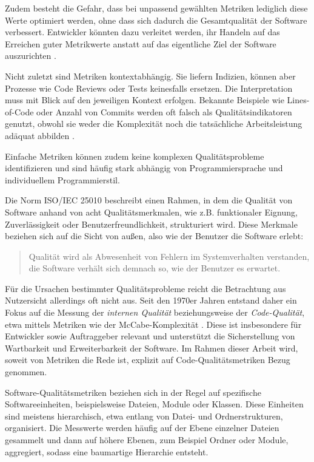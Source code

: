 Zudem besteht die Gefahr, dass bei unpassend gewählten Metriken lediglich diese Werte optimiert werden, ohne dass sich dadurch die Gesamtqualität der Software verbessert. Entwickler könnten dazu verleitet werden, ihr Handeln auf das Erreichen guter Metrikwerte anstatt auf das eigentliche Ziel der Software auszurichten \cite{worst_gitclear_2025}.

Nicht zuletzt sind Metriken kontextabhängig. Sie liefern Indizien, können aber Prozesse wie Code Reviews oder Tests keinesfalls ersetzen. Die Interpretation muss mit Blick auf den jeweiligen Kontext erfolgen. Bekannte Beispiele wie Lines-of-Code oder Anzahl von Commits werden oft falsch als Qualitätsindikatoren genutzt, obwohl sie weder die Komplexität noch die tatsächliche Arbeitsleistung adäquat abbilden \cite{worst_gitclear_2025}.

Einfache Metriken können zudem keine komplexen Qualitätsprobleme identifizieren \cite{voas_kuhn_2017} und sind häufig stark abhängig von Programmiersprache und individuellem Programmierstil.

\smallskip


Die Norm ISO/IEC 25010 \cite{iso25010_2024} beschreibt einen Rahmen, in dem die Qualität von Software anhand von acht Qualitätsmerkmalen, wie z.B. funktionaler Eignung, Zuverlässigkeit oder Benutzerfreundlichkeit, strukturiert wird. Diese Merkmale beziehen sich auf die Sicht von außen, also wie der Benutzer die Software erlebt:

\begin{quote}
    Qualität wird als Abwesenheit von Fehlern im Systemverhalten verstanden, die Software verhält sich demnach so, wie der Benutzer es erwartet.\cite[1]{Witte2018}
\end{quote}

Für die Ursachen bestimmter Qualitätsprobleme reicht die Betrachtung aus Nutzersicht allerdings oft nicht aus. Seit den 1970er Jahren entstand daher ein Fokus auf die Messung der \textit{internen Qualität} beziehungsweise der \textit{Code-Qualität}, etwa mittels Metriken wie der McCabe-Komplexität \cite{ludewig}. Diese ist insbesondere für Entwickler sowie Auftraggeber relevant und unterstützt die Sicherstellung von Wartbarkeit und Erweiterbarkeit der Software. Im Rahmen dieser Arbeit wird, soweit von Metriken die Rede ist, explizit auf Code-Qualitätsmetriken Bezug genommen.

\smallskip


Software-Qualitätsmetriken beziehen sich in der Regel auf spezifische Softwareeinheiten, beispielsweise Dateien, Module oder Klassen. Diese Einheiten sind meistens hierarchisch, etwa entlang von Datei- und Ordnerstrukturen, organisiert. Die Messwerte werden häufig auf der Ebene einzelner Dateien gesammelt und dann auf höhere Ebenen, zum Beispiel Ordner oder Module, aggregiert, sodass eine baumartige Hierarchie entsteht.

